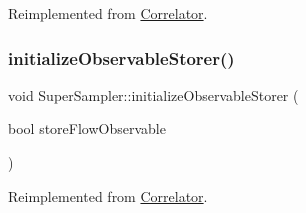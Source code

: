 Reimplemented from \mbox{\hyperlink{class_correlator_a7fb062b098beb078f3e546f4717b4941}{Correlator}}.

\mbox{\label{class_super_sampler_a4429d6ae37247a02259bc0c6d665821c}} 
\subsubsection{\texorpdfstring{initializeObservableStorer()}{initializeObservableStorer()}}
{\footnotesize\ttfamily void Super\+Sampler\+::initialize\+Observable\+Storer (\begin{DoxyParamCaption}\item[{bool}]{store\+Flow\+Observable }\end{DoxyParamCaption})\hspace{0.3cm}{\ttfamily [virtual]}}



Reimplemented from \mbox{\hyperlink{class_correlator_ab99886c09dd27dfc8676d0032cecf9bc}{Correlator}}.

